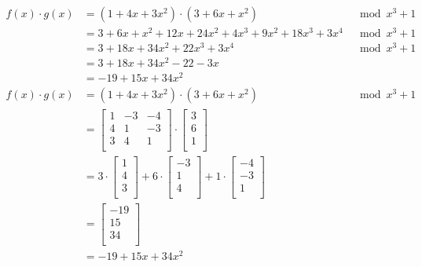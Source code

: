 \begin{align*}
  f(x)\cdot g(x) & = (1+4x+3x^2) \cdot (3+6x+x^2)                & \mod x^3+1 \\
                 & = 3+6x+x^2 + 12x+24x^2+4x^3 + 9x^2+18x^3+3x^4 & \mod x^3+1 \\
                 & = 3+18x+34x^2+22x^3+3x^4                      & \mod x^3+1 \\
                 & = 3+18x+34x^2-22-3x                           &            \\
                 & = -19+15x+34x^2                               &            \\
  f(x)\cdot g(x) & = (1+4x+3x^2) \cdot (3+6x+x^2)                & \mod x^3+1 \\
                 & = {
  \begin{bmatrix}
    1 & -3 & -4 \\
    4 & 1  & -3 \\
    3 & 4  & 1  \\
  \end{bmatrix}
  \cdot 
  \begin{bmatrix}
    3 \\
    6 \\
    1 \\
  \end{bmatrix} }                                                             \\
                 & = {
  3 \cdot \begin{bmatrix}
            1 \\
            4 \\
            3 \\
          \end{bmatrix}
  + 6 \cdot   \begin{bmatrix}
                -3 \\
                1  \\
                4  \\
              \end{bmatrix}
  + 1 \cdot   \begin{bmatrix}
                -4 \\
                -3 \\
                1  \\
              \end{bmatrix}
  }                                                                           \\
                 & = \begin{bmatrix}
                       -19 \\
                       15  \\
                       34  \\
                     \end{bmatrix}                                          \\
                 & = -19+15x+34x^2                                            \\                     
\end{align*}

